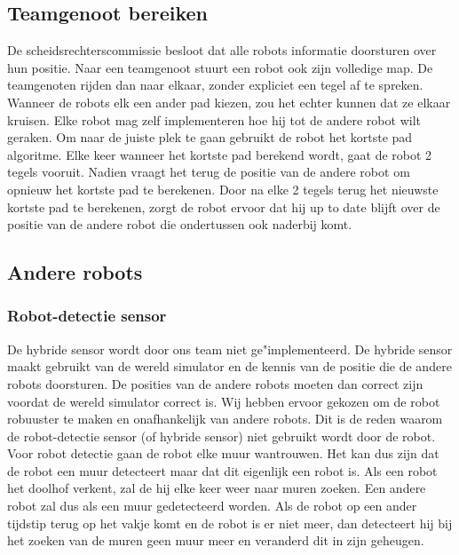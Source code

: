 \documentclass[tt3]{penoverslag}
\begin{document}
\subsection{Teamgenoot bereiken}
\label{ssec:AlgoAndereRobot}

De scheidsrechterscommissie besloot dat alle robots informatie doorsturen over hun positie. Naar een teamgenoot stuurt een robot ook zijn volledige map. De teamgenoten rijden dan naar elkaar, zonder expliciet een tegel af te spreken. Wanneer de robots elk een ander pad kiezen, zou het echter kunnen dat ze elkaar kruisen. Elke robot mag zelf implementeren hoe hij tot de andere robot wilt geraken.
Om naar de juiste plek te gaan gebruikt de robot het kortste pad algoritme. Elke keer wanneer het kortste pad berekend wordt, gaat de robot 2 tegels vooruit. Nadien vraagt het terug de positie van de andere robot om opnieuw het kortste pad te berekenen. Door na elke 2 tegels terug het nieuwste kortste pad te berekenen, zorgt de robot ervoor dat hij up to date blijft over de positie van de andere robot die ondertussen ook naderbij komt.

\subsection{Andere robots}
\subsubsection{Robot-detectie sensor}
\label{ssec:AlgoCollision}

De hybride sensor wordt door ons team niet ge"implementeerd. De hybride sensor maakt gebruikt van de wereld simulator en de kennis van de positie die de andere robots doorsturen. De posities van de andere robots moeten dan correct zijn voordat de wereld simulator correct is. Wij hebben ervoor gekozen om de robot robuuster te maken en onafhankelijk van andere robots. Dit is de reden waarom de robot-detectie sensor (of hybride sensor) niet gebruikt wordt door de robot. Voor robot detectie gaan de robot elke muur wantrouwen. Het kan dus zijn dat de robot een muur detecteert maar dat dit eigenlijk een robot is. Als een robot het doolhof verkent, zal de hij elke keer weer naar muren zoeken. Een andere robot zal dus als een muur gedetecteerd worden. Als de robot op een ander tijdstip terug op het vakje komt en de robot is er niet meer, dan detecteert hij bij het zoeken van de muren geen muur meer en veranderd dit in zijn geheugen. 
\end{document}
